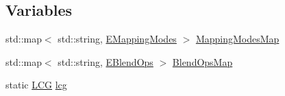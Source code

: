 \subsection*{Variables}
\begin{DoxyCompactItemize}
\item 
std::map$<$ std::string, \hyperlink{namespaceanl_aeb5211800782833998dbcdeddd3b7182}{EMappingModes} $>$ \hyperlink{namespaceanl_a9dd48203bb1abdf23c826a3caa413ae3}{MappingModesMap}
\item 
std::map$<$ std::string, \hyperlink{namespaceanl_a7defa07650ae1bf85b1031eb93e04734}{EBlendOps} $>$ \hyperlink{namespaceanl_a47cf9613caed8221805a2216a6a90e56}{BlendOpsMap}
\item 
static \hyperlink{classanl_1_1LCG}{LCG} \hyperlink{namespaceanl_a58089fb2d6abef1dba564f4c9ccbf88d}{lcg}
\end{DoxyCompactItemize}


